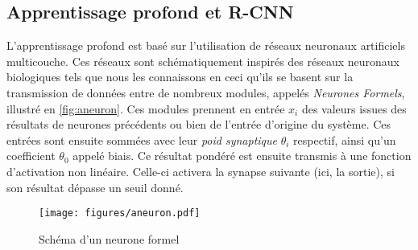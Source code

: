
		\subsection{Apprentissage profond et R-CNN}

			L'apprentissage profond est basé sur l'utilisation de réseaux neuronaux artificiels multicouche. Ces réseaux sont schématiquement inspirés des réseaux neuronaux biologiques tels que nous les connaissons en ceci qu'ils se basent sur la transmission de données entre de nombreux modules, appelés \emph{Neurones Formels}, illustré en \autoref{fig:aneuron}. Ces modules prennent en entrée $x_{i}$ des valeurs issues des résultats de neurones précédents ou bien de l'entrée d'origine du système. Ces entrées sont ensuite sommées avec leur \emph{poid synaptique} $\theta_{i}$ respectif, ainsi qu’un coefficient $\theta_{0}$ appelé biais. Ce résultat pondéré est ensuite transmis à une fonction d’activation non linéaire. Celle-ci activera la synapse suivante (ici, la sortie), si son résultat dépasse un seuil donné.
			\begin{figure}[h]
			{
				\centering
				\texttt{[image: figures/aneuron.pdf]}
				\caption{Schéma d'un neurone formel}
				\label{fig:aneuron}
			}
			\end{figure}
			
			

